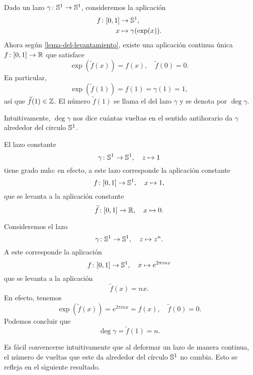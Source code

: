\documentclass{article}
\numberwithin{equation}{section}
\begin{document}
\begin{definicion}
  Dado un lazo $\gamma\colon \mathbb{S}^1 \to \mathbb{S}^1$, consideremos la aplicación
  \begin{align*}
    f\colon [0,1] & \to \mathbb{S}^1,\\
    x & \mapsto \gamma (\exp (x)).
  \end{align*}
  Ahora según \ref{lema-del-levantamiento}, existe una aplicación continua única
  $f\colon [0,1] \to \mathbb{R}$ que satisface
  $$\exp (\widetilde{f} (x)) = f (x), \quad \widetilde{f} (0) = 0.$$
  En particular,
  $$\exp (\widetilde{f} (1)) = f (1) = \gamma (1) = 1,$$
  así que $\widetilde{f} (1) \in \mathbb{Z}$. El número $\widetilde{f} (1)$ se llama
  el  del lazo $\gamma$ y se denota por
  $\deg \gamma$.
\end{definicion}

Intuitivamente, $\deg \gamma$ nos dice cuántas vueltas en el sentido antihorario
da $\gamma$ alrededor del circulo $\mathbb{S}^1$.

\begin{ejemplo}
  El lazo constante
  $$\gamma\colon \mathbb{S}^1 \to \mathbb{S}^1, \quad z \mapsto 1$$
  tiene grado nulo: en efecto, a este lazo corresponde la aplicación constante
  $$f\colon [0,1] \to \mathbb{S}^1, \quad x \mapsto 1,$$
  que se levanta a la aplicación constante
  $$\widetilde{f}\colon [0,1] \to \mathbb{R}, \quad x \mapsto 0.$$
\end{ejemplo}

\begin{ejemplo}
  Consideremos el lazo
  $$\gamma\colon \mathbb{S}^1 \to \mathbb{S}^1, \quad z \mapsto z^n.$$
  A este corresponde la aplicación
  $$f\colon [0,1] \to \mathbb{S}^1, \quad x \mapsto e^{2\pi i n x}$$
  que se levanta a la aplicación
  $$\widetilde{f} (x) = nx.$$
  En efecto, tenemos
  \[ \exp (\widetilde{f} (x)) = e^{2\pi i n x} = f (x), \quad
    \widetilde{f} (0) = 0. \]
  Podemos concluir que
  $$\deg \gamma = \widetilde{f} (1) = n.$$
\end{ejemplo}

Es fácil convencerse intuitivamente que al deformar un lazo de manera continua,
el número de vueltas que este da alrededor del círculo $\mathbb{S}^1$ no cambia. Esto
se refleja en el siguiente resultado.
\end{document}
